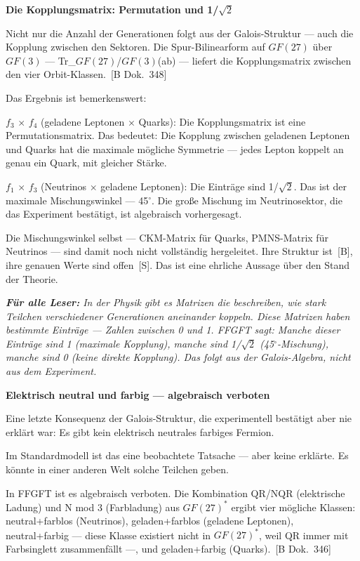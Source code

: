 \documentclass[11pt,oneside]{book}
\newcommand{\status}[1]{\penalty10000\,{\scriptsize\textcolor{gray!60}{[#1]}}}
\newenvironment{laierspur}{%
  \par\vspace{4pt}%
  \noindent\small\itshape\color{blue!60!black}%
  \textbf{Für alle Leser:}\enspace\ignorespaces}{%
  \par\vspace{4pt}\normalsize\normalfont\normalcolor}
\begin{document}
\textbf{Die Kopplungsmatrix: Permutation und 1/$\sqrt{2}$}


Nicht nur die Anzahl der Generationen folgt aus der Galois-Struktur —
auch die Kopplung zwischen den Sektoren. Die Spur-Bilinearform auf
$GF(27)$ über $GF(3)$ — Tr\_{$GF(27)$/$GF(3)$}(ab) — liefert die Kopplungsmatrix
zwischen den vier Orbit-Klassen. \status{B Dok.~348}


Das Ergebnis ist bemerkenswert:


$f_3$ $\times$ $f_4$ (geladene Leptonen $\times$ Quarks): Die Kopplungsmatrix ist eine
Permutationsmatrix. Das bedeutet: Die Kopplung zwischen geladenen Leptonen
und Quarks hat die maximale mögliche Symmetrie — jedes Lepton koppelt an
genau ein Quark, mit gleicher Stärke.


$f_1$ $\times$ $f_3$ (Neutrinos $\times$ geladene Leptonen): Die Einträge sind 1/$\sqrt{2}$. Das ist
der maximale Mischungswinkel — 45$^\circ$. Die große Mischung im Neutrinosektor,
die das Experiment bestätigt, ist algebraisch vorhergesagt.


Die Mischungswinkel selbst — CKM-Matrix für Quarks, PMNS-Matrix für
Neutrinos — sind damit noch nicht vollständig hergeleitet. Ihre Struktur
ist \status{B}, ihre genauen Werte sind offen \status{S}. Das ist eine ehrliche Aussage
über den Stand der Theorie.


\begin{laierspur}
In der Physik gibt es Matrizen die beschreiben, wie stark
Teilchen verschiedener Generationen aneinander koppeln. Diese Matrizen
haben bestimmte Einträge — Zahlen zwischen 0 und 1. FFGFT sagt: Manche
dieser Einträge sind 1 (maximale Kopplung), manche sind 1/$\sqrt{2}$ (45$^\circ$-Mischung),
manche sind 0 (keine direkte Kopplung). Das folgt aus der Galois-Algebra,
nicht aus dem Experiment.
\end{laierspur}

\textbf{Elektrisch neutral und farbig — algebraisch verboten}


Eine letzte Konsequenz der Galois-Struktur, die experimentell bestätigt
aber nie erklärt war: Es gibt kein elektrisch neutrales farbiges Fermion.


Im Standardmodell ist das eine beobachtete Tatsache — aber keine erklärte.
Es könnte in einer anderen Welt solche Teilchen geben.


In FFGFT ist es algebraisch verboten. Die Kombination QR/NQR (elektrische
Ladung) und N mod 3 (Farbladung) aus $GF(27)^*$ ergibt vier mögliche Klassen:
neutral+farblos (Neutrinos), geladen+farblos (geladene Leptonen),
neutral+farbig — diese Klasse existiert nicht in $GF(27)^*$, weil QR immer
mit Farbsinglett zusammenfällt —, und geladen+farbig (Quarks). \status{B Dok.~346}
\end{document}
